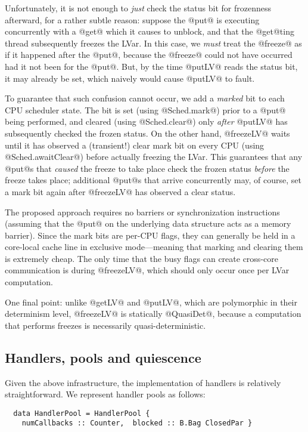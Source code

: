 Unfortunately, it is not enough to \emph{just} check the status bit
for frozenness afterward, for a rather subtle reason: suppose the
@put@ is executing concurrently with a @get@ which it causes to
unblock, and that the @get@ting thread subsequently freezes the LVar.
In this case, we \emph{must} treat the @freeze@ as if it happened
after the @put@, because the @freeze@ could not have occurred had it
not been for the @put@. But, by the time @putLV@ reads the status bit,
it may already be set, which naively would cause @putLV@ to fault.

To guarantee that such confusion cannot occur, we add a \emph{marked}
bit to each CPU scheduler state.  The bit is set (using @Sched.mark@)
prior to a @put@ being performed, and cleared (using @Sched.clear@)
only \emph{after} @putLV@ has subsequently checked the frozen status.
On the other hand, @freezeLV@ waits until it has observed a
(transient!) clear mark bit on every CPU (using @Sched.awaitClear@)
before actually freezing the LVar.  This guarantees that any @put@s
that \emph{caused} the freeze to take place check the frozen status
\emph{before} the freeze takes place; additional @put@s that arrive
concurrently may, of course, set a mark bit again after @freezeLV@ has
observed a clear status.

The proposed approach requires no barriers or synchronization
instructions (assuming that the @put@ on the underlying data structure
acts as a memory barrier).  Since the mark bits are per-CPU flags,
they can generally be held in a core-local cache line in exclusive
mode---meaning that marking and clearing them is extremely cheap.  The
only time that the busy flags can create cross-core communication is
during @freezeLV@, which should only occur once per LVar computation.

One final point: unlike @getLV@ and @putLV@, which are polymorphic in
their determinism level, @freezeLV@ is statically @QuasiDet@, because
a computation that performs freezes is necessarily
quasi-deterministic.

\subsection{Handlers, pools and quiescence}

Given the above infrastructure, the implementation of handlers is
relatively straightforward.  We represent handler pools as follows:

\begin{lstlisting}
  data HandlerPool = HandlerPool {
    numCallbacks :: Counter,  blocked :: B.Bag ClosedPar }
\end{lstlisting}

